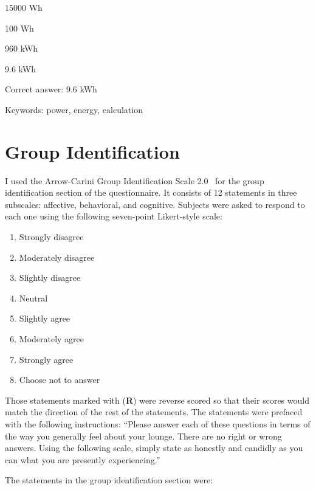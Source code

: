 \begin{answer}
	\item 15000 Wh
	\item 100 Wh
	\item 960 kWh
	\item 9.6 kWh
\end{answer}

Correct answer: 9.6 kWh

Keywords: power, energy, calculation


\section{Group Identification}
\label{group-id-items}

I used the Arrow-Carini Group Identification Scale 2.0~\cite{Henry1999} for the group identification section of the questionnaire. It consists of 12 statements in three subscales: affective, behavioral, and cognitive. Subjects were asked to respond to each one using the following seven-point Likert-style scale:

\begin{enumerate}
	\item Strongly disagree
	\item Moderately disagree
	\item Slightly disagree
	\item Neutral
	\item Slightly agree
	\item Moderately agree
	\item Strongly agree
	\item Choose not to answer
\end{enumerate}

Those statements marked with (\textbf{R}) were reverse scored so that their scores would match the direction of the rest of the statements. The statements were prefaced with the following instructions: ``Please answer each of these questions in terms of the way you generally feel about your lounge. There are no right or wrong answers. Using the following scale, simply state as honestly and candidly as you can what you are presently experiencing.''

The statements in the group identification section were:

